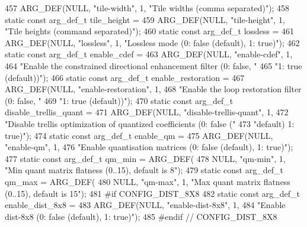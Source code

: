 \begin{DoxyCodeInclude}
{{{{{{{457     ARG\_DEF(NULL, \textcolor{stringliteral}{"tile-width"}, 1, \textcolor{stringliteral}{"Tile widths (comma separated)"});
458 \textcolor{keyword}{static} \textcolor{keyword}{const} arg\_def\_t tile\_height =
459     ARG\_DEF(NULL, \textcolor{stringliteral}{"tile-height"}, 1, \textcolor{stringliteral}{"Tile heights (command separated)"});
460 \textcolor{keyword}{static} \textcolor{keyword}{const} arg\_def\_t lossless =
461     ARG\_DEF(NULL, \textcolor{stringliteral}{"lossless"}, 1, \textcolor{stringliteral}{"Lossless mode (0: false (default), 1: true)"});
462 \textcolor{keyword}{static} \textcolor{keyword}{const} arg\_def\_t enable\_cdef =
463     ARG\_DEF(NULL, \textcolor{stringliteral}{"enable-cdef"}, 1,
464         \textcolor{stringliteral}{"Enable the constrained directional enhancement filter (0: false, "}
465         \textcolor{stringliteral}{"1: true (default))"});
466 \textcolor{keyword}{static} \textcolor{keyword}{const} arg\_def\_t enable\_restoration =
467     ARG\_DEF(NULL, \textcolor{stringliteral}{"enable-restoration"}, 1,
468         \textcolor{stringliteral}{"Enable the loop restoration filter (0: false, "}
469         \textcolor{stringliteral}{"1: true (default))"});
470 \textcolor{keyword}{static} \textcolor{keyword}{const} arg\_def\_t disable\_trellis\_quant =
471     ARG\_DEF(NULL, \textcolor{stringliteral}{"disable-trellis-quant"}, 1,
472         \textcolor{stringliteral}{"Disable trellis optimization of quantized coefficients (0: false ("}
473         \textcolor{stringliteral}{"default) 1: true)"});
474 \textcolor{keyword}{static} \textcolor{keyword}{const} arg\_def\_t enable\_qm =
475     ARG\_DEF(NULL, \textcolor{stringliteral}{"enable-qm"}, 1,
476         \textcolor{stringliteral}{"Enable quantisation matrices (0: false (default), 1: true)"});
477 \textcolor{keyword}{static} \textcolor{keyword}{const} arg\_def\_t qm\_min = ARG\_DEF(
478     NULL, \textcolor{stringliteral}{"qm-min"}, 1, \textcolor{stringliteral}{"Min quant matrix flatness (0..15), default is 8"});
479 \textcolor{keyword}{static} \textcolor{keyword}{const} arg\_def\_t qm\_max = ARG\_DEF(
480     NULL, \textcolor{stringliteral}{"qm-max"}, 1, \textcolor{stringliteral}{"Max quant matrix flatness (0..15), default is 15"});
481 \textcolor{preprocessor}{#if CONFIG\_DIST\_8X8}
482 \textcolor{keyword}{static} \textcolor{keyword}{const} arg\_def\_t enable\_dist\_8x8 =
483     ARG\_DEF(NULL, \textcolor{stringliteral}{"enable-dist-8x8"}, 1,
484         \textcolor{stringliteral}{"Enable dist-8x8 (0: false (default), 1: true)"});
485 \textcolor{preprocessor}{#endif  // CONFIG\_DIST\_8X8}
}}}}}}}
\end{DoxyCodeInclude}
